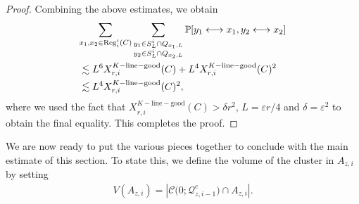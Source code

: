 \documentclass[11pt]{article}
\theoremstyle{definition}
\theoremstyle{remark}
\newcommand{\bP}{\mathbb{P}}
\numberwithin{equation}{section}
\theoremstyle{plain}
\theoremstyle{definition}
\theoremstyle{remark}
\theoremstyle{plain}
\begin{document}
\begin{proof}
Combining the above estimates, we obtain
\begin{align*}
    \lefteqn{\sum_{x_1,x_2 \in \mathrm{Reg}_i'(C)}\sum_{\substack{y_1\in S_L^i\cap Q_{x_1,L}\\ y_2\in S_L^i\cap Q_{x_2,L}}}\bP[y_1 \longleftrightarrow x_1,y_2 \longleftrightarrow x_2]}\\
    &\lesssim L^6X_{r,i}^{K-\mathrm{line-good}}(C)+L^4X_{r,i}^{K-\mathrm{line-good}}(C)^2\\
    &\lesssim L^4X_{r,i}^{K-\mathrm{line-good}}(C)^2,
\end{align*}
where we used the fact that $X_{r,i}^{K-\mathrm{line-good}}(C)>\delta r^2$, $L=\varepsilon r/4$ and $\delta=\varepsilon^2$ to obtain the final equality. This completes the proof.
\end{proof}

We are now ready to put the various pieces together to conclude with the main estimate of this section. To state this, we define the volume of the cluster in $A_{z,i}$ by setting
\begin{align}
V(A_{z,i})=\left|\mathcal C\big(0; \mathcal Q_{z,{i-1}}^c\big)\cap A_{z,i} \right|.\label{voldef}
\end{align}
\end{document}
